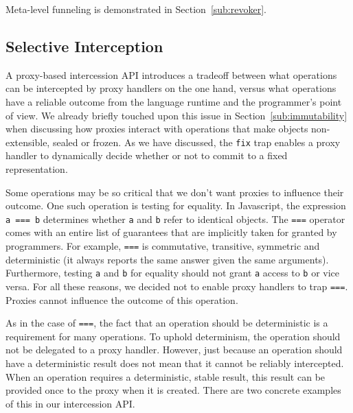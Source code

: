 \documentclass{sig-alternate}
\begin{document}
Meta-level funneling is demonstrated in Section~\ref{sub:revoker}.



\subsection{Selective Interception}
\label{sub:selective}

A proxy-based intercession API introduces a tradeoff between what operations can be intercepted by proxy handlers on the one hand, versus what operations have a reliable outcome from the language runtime and the programmer's point of view. We already briefly touched upon this issue in Section~\ref{sub:immutability} when discussing how proxies interact with operations that make objects non-extensible, sealed or frozen. As we have discussed, the \texttt{fix} trap enables a proxy handler to dynamically decide whether or not to commit to a fixed representation.

Some operations may be so critical that we don't want proxies to influence their outcome. One such operation is testing for equality. In Javascript, the expression \texttt{a === b} determines whether \texttt{a} and \texttt{b} refer to identical objects. The \texttt{===} operator comes with an entire list of guarantees that are implicitly taken for granted by programmers. For example, \texttt{===} is commutative, transitive, symmetric and deterministic (it always reports the same answer given the same arguments). Furthermore, testing \texttt{a} and \texttt{b} for equality should not grant \texttt{a} access to \texttt{b} or vice versa. For all these reasons, we decided not to enable proxy handlers to trap \texttt{===}. Proxies cannot influence the outcome of this operation.

As in the case of \texttt{===}, the fact that an operation should be deterministic is a requirement for many operations. To uphold determinism, the operation should not be delegated to a proxy handler. However, just because an operation should have a deterministic result does not mean that it cannot be reliably intercepted. When an operation requires a deterministic, stable result, this result can be provided once to the proxy when it is created. There are two concrete examples of this in our intercession API.
\end{document}
